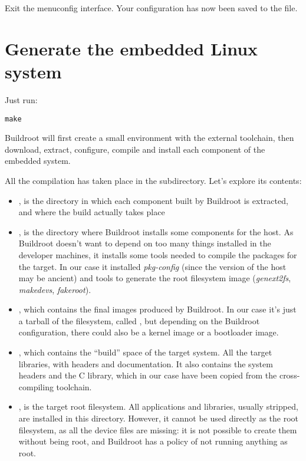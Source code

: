 Exit the menuconfig interface. Your configuration has now been saved
to the  file.

\section{Generate the embedded Linux system}

Just run:

\begin{verbatim}
make
\end{verbatim}

Buildroot will first create a small environment with the external
toolchain, then download, extract, configure, compile and install each
component of the embedded system.

All the compilation has taken place in the  subdirectory. Let's
explore its contents:

\begin{itemize}

\item {}, is the directory in which each component built by
  Buildroot is extracted, and where the build actually takes place

\item {}, is the directory where Buildroot installs some
  components for the host. As Buildroot doesn't want to depend on too
  many things installed in the developer machines, it installs some
  tools needed to compile the packages for the target. In our case it
  installed {\em pkg-config} (since the version of the host may be ancient)
  and tools to generate the root filesystem image ({\em genext2fs},
  {\em makedevs}, {\em fakeroot}).

\item {}, which contains the final images produced by
  Buildroot. In our case it's just a tarball of the filesystem, called
  , but depending on the Buildroot configuration,
  there could also be a kernel image or a bootloader image.

\item {}, which contains the “build” space of the target
  system. All the target libraries, with headers and documentation. It
  also contains the system headers and the C library, which in our
  case have been copied from the cross-compiling toolchain.

\item {}, is the target root filesystem. All applications
  and libraries, usually stripped, are installed in this
  directory. However, it cannot be used directly as the root
  filesystem, as all the device files are missing: it is not possible
  to create them without being root, and Buildroot has a policy of not
  running anything as root.

\end{itemize}

